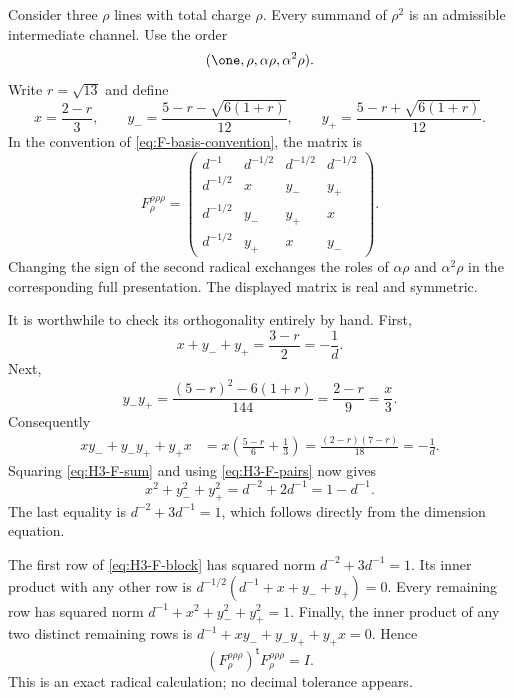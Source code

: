 Consider three $\rho$ lines with total charge $\rho$.  Every summand
of $\rho^2$ is an admissible intermediate channel.  Use the order
\[
 (\one,\rho,\alpha\rho,\alpha^2\rho).
\]
Write $r=\sqrt{13}$ and define
\begin{equation}
 x=\frac{2-r}{3},\qquad
 y_- =\frac{5-r-\sqrt{6(1+r)}}{12},\qquad
 y_+ =\frac{5-r+\sqrt{6(1+r)}}{12}.
 \label{eq:H3-F-coefficients}
\end{equation}
In the convention of \eqref{eq:F-basis-convention}, the matrix is
\begin{equation}
 F^{\rho\rho\rho}_{\rho}
 =\begin{pmatrix}
 d^{-1}&d^{-1/2}&d^{-1/2}&d^{-1/2}\\
 d^{-1/2}&x&y_-&y_+\\
 d^{-1/2}&y_-&y_+&x\\
 d^{-1/2}&y_+&x&y_-
 \end{pmatrix}.
 \label{eq:H3-F-block}
\end{equation}
Changing the sign of the second radical exchanges the roles of
$\alpha\rho$ and $\alpha^2\rho$ in the corresponding full
presentation.  The displayed matrix is real and symmetric.

It is worthwhile to check its orthogonality entirely by hand.  First,
\begin{equation}
 x+y_-+y_+=\frac{3-r}{2}=-\frac1d.
 \label{eq:H3-F-sum}
\end{equation}
Next,
\[
 y_-y_+=\frac{(5-r)^2-6(1+r)}{144}
 =\frac{2-r}{9}=\frac{x}{3}.
\]
Consequently
\begin{align}
 xy_-+y_-y_++y_+x
 &=x\left(\frac{5-r}{6}+\frac13\right)
 =\frac{(2-r)(7-r)}{18}
 =-\frac1d.\label{eq:H3-F-pairs}
\end{align}
Squaring \eqref{eq:H3-F-sum} and using
\eqref{eq:H3-F-pairs} now gives
\begin{equation}
 x^2+y_-^2+y_+^2=d^{-2}+2d^{-1}=1-d^{-1}.
 \label{eq:H3-F-squares}
\end{equation}
The last equality is $d^{-2}+3d^{-1}=1$, which follows directly
from the dimension equation.

The first row of \eqref{eq:H3-F-block} has squared norm
$d^{-2}+3d^{-1}=1$.  Its inner product with any other row is
$d^{-1/2}(d^{-1}+x+y_-+y_+)=0$.  Every remaining row has squared
norm $d^{-1}+x^2+y_-^2+y_+^2=1$.  Finally, the inner product
of any two distinct remaining rows is
$d^{-1}+xy_-+y_-y_++y_+x=0$.  Hence
\begin{equation}
 (F^{\rho\rho\rho}_{\rho})^{\mathsf t}
 F^{\rho\rho\rho}_{\rho}=I.
 \label{eq:H3-F-orthogonal}
\end{equation}
This is an exact radical calculation; no decimal tolerance appears.

